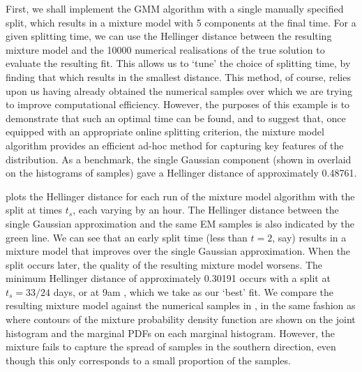 First, we shall implement the GMM algorithm with a single manually specified split, which results in a mixture model with 5 components at the final time.
For a given splitting time, we can use the Hellinger distance between the resulting mixture model and the 10000 numerical realisations of the true solution to evaluate the resulting fit.
This allows us to `tune' the choice of splitting time, by finding that which results in the smallest distance.
This method, of course, relies upon us having already obtained the numerical samples over which we are trying to improve computational efficiency.
However, the purposes of this example is to demonstrate that such an optimal time can be found, and to suggest that, once equipped with an appropriate online splitting criterion, the mixture model algorithm provides an efficient ad-hoc method for capturing key features of the distribution.
As a benchmark, the single Gaussian component (shown in  overlaid on the histograms of samples) gave a Hellinger distance of approximately 0.48761.

 plots the Hellinger distance for each run of the mixture model algorithm with the split at times \(t_s\), each varying by an hour.
The Hellinger distance between the single Gaussian approximation and the same EM samples is also indicated by the green line.
We can see that an early split time (less than \(t = 2\), say) results in a mixture model that improves over the single Gaussian approximation.
When the split occurs later, the quality of the resulting mixture model worsens.
The minimum Hellinger distance of approximately 0.30191 occurs with a split at \(t_s = 33/24\) days, or at 9am , which we take as our `best' fit.
We compare the resulting mixture model against the numerical samples in , in the same fashion as  where contours of the mixture probability density function are shown on the joint histogram and the marginal PDFs on each marginal histogram.
However, the mixture fails to capture the spread of samples in the southern direction, even though this only corresponds to a small proportion of the samples.


